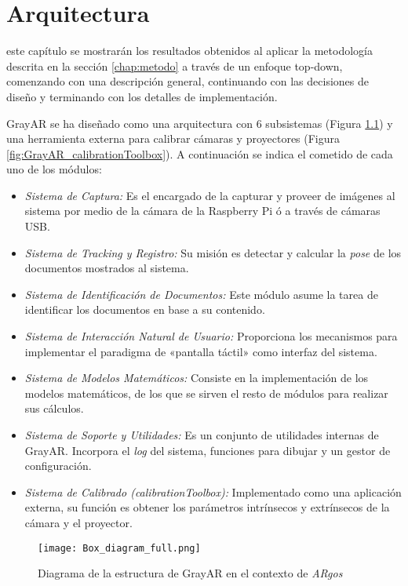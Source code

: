 \chapter{Arquitectura}
\label{chap:arquitectura}
 este capítulo se mostrarán los resultados obtenidos al aplicar la metodología descrita en la sección \ref{chap:metodo} a través de un enfoque top-down, comenzando con una descripción general, continuando con las decisiones de diseño y terminando con los detalles de implementación. 

GrayAR se ha diseñado como una arquitectura con 6 subsistemas (Figura \ref{fig:GrayAR_schema}) y una herramienta externa para calibrar cámaras y proyectores (Figura \ref{fig:GrayAR_calibrationToolbox}). A continuación se indica el cometido de cada uno de los módulos:

\begin{itemize}
\item \textit{Sistema de Captura:} Es el encargado de la capturar y proveer de imágenes al sistema por medio de la cámara de la Raspberry Pi ó a través de cámaras USB.
\item \textit{Sistema de \textit{Tracking} y Registro:} Su misión es detectar y calcular la \textit{pose} de los documentos mostrados al sistema.
\item \textit{Sistema de Identificación de Documentos:} Este módulo asume la tarea de identificar los documentos en base a su contenido.
\item \textit{Sistema de Interacción Natural de Usuario:} Proporciona los mecanismos para implementar el paradigma de «pantalla táctil» como interfaz del sistema.
\item \textit{Sistema de Modelos Matemáticos:} Consiste en la implementación de los modelos matemáticos, de los que se sirven el resto de módulos para realizar sus cálculos.
\item \textit{Sistema de Soporte y Utilidades:} Es un conjunto de utilidades internas de GrayAR. Incorpora el \textit{log} del sistema, funciones para dibujar y un gestor de configuración.
\item \textit{Sistema de Calibrado (calibrationToolbox):} Implementado como una aplicación externa, su función es obtener los parámetros intrínsecos y extrínsecos de la cámara y el proyector.
\end{itemize}

\begin{figure}
  \centering
  \texttt{[image: Box\_diagram\_full.png]}
  \caption{Diagrama de la estructura de GrayAR en el contexto de \textit{ARgos}}
  \label{fig:GrayAR_schema}
\end{figure}


